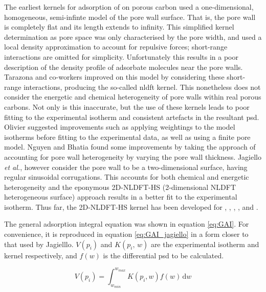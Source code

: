 The earliest kernels for \gls{adsorption} of  on porous carbon used a one-dimensional, homogeneous, semi-infinte model of the pore wall surface.\citep{seaton1989new} That is, the pore wall is completely flat and its length extends to infinity. This simplified kernel determination as pore space was only characterised by the pore width, and used a local density approximation to account for repulsive forces; short-range interactions are omitted for simplicity. Unfortunately this results in a poor description of the density profile of \gls{adsorbate} molecules near the pore walls. Tarazona and co-workers improved on this model by considering these short-range interactions, producing the so-called \acrfull{nldft} kernel.\citep{tarazona1985free, tarazona1987phase} This nonetheless does not consider the energetic and chemical heterogeneity of pore walls within real porous carbons. Not only is this inaccurate, but the use of these kernels leads to poor fitting to the experimental isotherm and consistent artefacts in the resultant \acrshort{psd}.\citep{Jagiello20132D,  olivier1998improving, lueking2009tests, nguyen2004characterization} Olivier suggested improvements such as applying weightings to the model isotherms before fitting to the experimental data, as well as using a finite pore model.\citep{olivier1998improving} Nguyen and Bhatia found some improvements by taking the approach of accounting for pore wall heterogeneity by varying the pore wall thickness.\citep{nguyen2004characterization} Jagiello \textit{et al.}, however consider the pore wall to be a two-dimensional surface, having regular sinusoidal corrugations. This accounts for both chemical and energetic heterogeneity\citep{Jagiello20132D} and the eponymous 2D-NLDFT-HS (2-dimensional NLDFT heterogeneous surface) approach results in a better fit to the experimental isotherm.\citep{Jagiello20132D, puziy2016comparison, shi2021current} Thus far, the 2D-NLDFT-HS kernel has been developed for , , , , and .\citep{Jagiello20132D, Jagiello2013, jagiello2019consistency, Jagiello2020Exploiting}

The general \gls{adsorption} integral equation was shown in equation \ref{eq:GAI}. For convenience, it is reproduced in equation \ref{eq:GAI_jagiello} in a form closer to that used by Jagielllo. $V(p_i)$ and $K(p_i,\,w)$ are the experimental isotherm and kernel respectively, and $f(w)$ is the differential \acrshort{psd} to be calculated.

\begin{equation} \label{eq:GAI_jagiello}
    V(p_i) = \int_{w_{min}}^{w_{max}} K(p_i,w) f(w) \, \mathrm{d}w
\end{equation}

